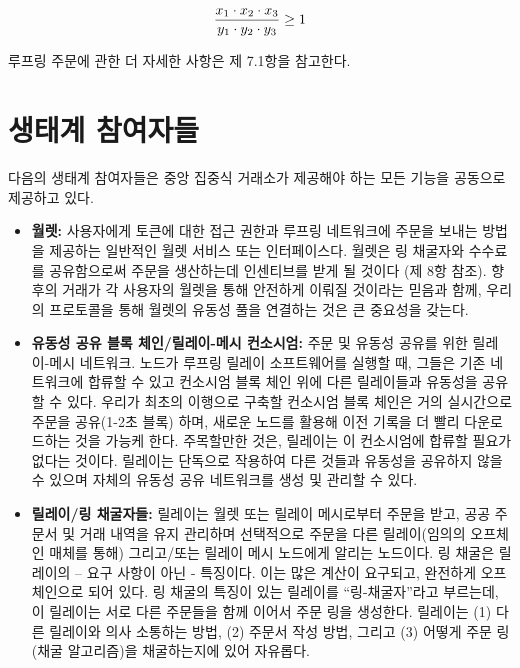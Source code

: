 \documentclass{article}
\begin{document}
\begin{multicols}{2}
\begin{equation}
	{{x_1 \cdot x_2 \cdot x_3 \over y_1 \cdot y_2 \cdot y_3}\geq 1}
\end{equation}

루프링 주문에 관한 더 자세한 사항은 제 7.1항을 참고한다.  



\section{생태계 참여자들\label{sec:ecosystem}}
다음의 생태계 참여자들은 중앙 집중식 거래소가 제공해야 하는 모든 기능을 공동으로 제공하고 있다.

\begin{itemize}
	
	\item \textbf{월렛:} 사용자에게 토큰에 대한 접근 권한과 루프링 네트워크에 주문을 보내는 방법을 제공하는 일반적인 월렛 서비스 또는 인터페이스다. 월렛은 링 채굴자와 수수료를 공유함으로써 주문을 생산하는데 인센티브를 받게 될 것이다 (제 8항 참조). 향후의 거래가 각 사용자의 월렛을 통해 안전하게 이뤄질 것이라는 믿음과 함께, 우리의 프로토콜을 통해 월렛의 유동성 풀을 연결하는 것은 큰 중요성을 갖는다.

	\item \textbf{유동성 공유 블록 체인/릴레이-메시 컨소시엄:} 주문 및 유동성 공유를 위한 릴레이-메시 네트워크. 노드가 루프링 릴레이 소프트웨어를 실행할 때, 그들은 기존 네트워크에 합류할 수 있고 컨소시엄 블록 체인 위에 다른 릴레이들과 유동성을 공유할 수 있다. 우리가 최초의 이행으로 구축할 컨소시엄 블록 체인은 거의 실시간으로 주문을 공유(1-2초 블록) 하며, 새로운 노드를 활용해 이전 기록을 더 빨리 다운로드하는 것을 가능케 한다. 주목할만한 것은, 릴레이는 이 컨소시엄에 합류할 필요가 없다는 것이다. 릴레이는 단독으로 작용하여 다른 것들과 유동성을 공유하지 않을 수 있으며 자체의 유동성 공유 네트워크를 생성 및 관리할 수 있다.

	\item \textbf{릴레이/링 채굴자들:} 릴레이는 월렛 또는 릴레이 메시로부터 주문을 받고, 공공 주문서 및 거래 내역을 유지 관리하며 선택적으로 주문을 다른 릴레이(임의의 오프체인 매체를 통해) 그리고/또는 릴레이 메시 노드에게 알리는 노드이다. 링 채굴은 릴레이의 – 요구 사항이 아닌 - 특징이다. 이는 많은 계산이 요구되고, 완전하게 오프 체인으로 되어 있다. 링 채굴의 특징이 있는 릴레이를 “링-채굴자”라고 부르는데, 이 릴레이는 서로 다른 주문들을 함께 이어서 주문 링을 생성한다. 릴레이는 (1) 다른 릴레이와 의사 소통하는 방법, (2) 주문서 작성 방법, 그리고 (3) 어떻게 주문 링(채굴 알고리즘)을 채굴하는지에 있어 자유롭다.


\end{itemize}
\end{multicols}
\end{document}
